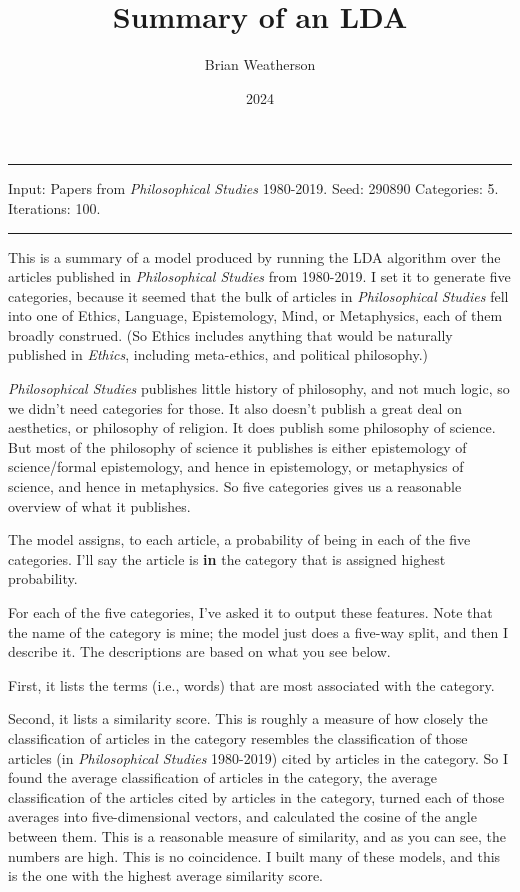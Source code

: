 \documentclass[
  10pt,
  letterpaper,
  DIV=11,
  numbers=noendperiod,
  twoside]{scrartcl}
\title{Summary of an LDA}
\author{Brian Weatherson}
\date{2024}
\renewenvironment{abstract}
 {\vspace{-1.25cm}
 \quotation\small\noindent\rule{\linewidth}{.5pt}\par\smallskip
 \noindent }
 {\par\noindent\rule{\linewidth}{.5pt}\endquotation}
\begin{document}
\maketitle
\begin{abstract}
Input: Papers from \emph{Philosophical Studies} 1980-2019. Seed: 290890
Categories: 5. Iterations: 100.
\end{abstract}

This is a summary of a model produced by running the LDA algorithm over
the articles published in \emph{Philosophical Studies} from 1980-2019. I
set it to generate five categories, because it seemed that the bulk of
articles in \emph{Philosophical Studies} fell into one of Ethics,
Language, Epistemology, Mind, or Metaphysics, each of them broadly
construed. (So Ethics includes anything that would be naturally
published in \emph{Ethics}, including meta-ethics, and political
philosophy.)

\emph{Philosophical Studies} publishes little history of philosophy, and
not much logic, so we didn't need categories for those. It also doesn't
publish a great deal on aesthetics, or philosophy of religion. It does
publish some philosophy of science. But most of the philosophy of
science it publishes is either epistemology of science/formal
epistemology, and hence in epistemology, or metaphysics of science, and
hence in metaphysics. So five categories gives us a reasonable overview
of what it publishes.

The model assigns, to each article, a probability of being in each of
the five categories. I'll say the article is \textbf{in} the category
that is assigned highest probability.

For each of the five categories, I've asked it to output these features.
Note that the name of the category is mine; the model just does a
five-way split, and then I describe it. The descriptions are based on
what you see below.

First, it lists the terms (i.e., words) that are most associated with
the category.

Second, it lists a similarity score. This is roughly a measure of how
closely the classification of articles in the category resembles the
classification of those articles (in \emph{Philosophical Studies}
1980-2019) cited by articles in the category. So I found the average
classification of articles in the category, the average classification
of the articles cited by articles in the category, turned each of those
averages into five-dimensional vectors, and calculated the cosine of the
angle between them. This is a reasonable measure of similarity, and as
you can see, the numbers are high. This is no coincidence. I built many
of these models, and this is the one with the highest average similarity
score.
\end{document}
